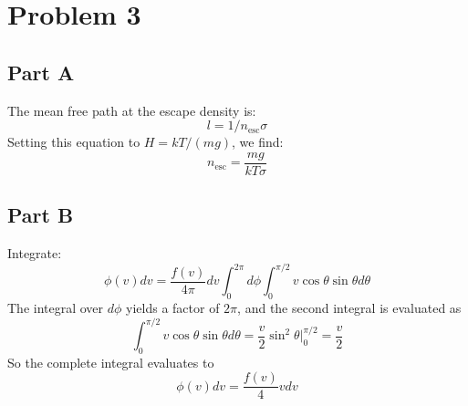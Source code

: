 \documentclass[a4paper, 11pt]{article}
\begin{document}
\section*{Problem 3}
	\subsection*{Part A}
		The mean free path at the escape density is: 
		\begin{equation*}
			l = 1/n_\text{esc}\sigma
		\end{equation*}
		Setting this equation to $H = kT/(mg)$, we find: 
		\begin{equation*}
			n_\text{esc} =\frac{mg}{kT\sigma}
		\end{equation*}
	\subsection*{Part B}
		Integrate:
		\begin{equation*}
			\phi(v)dv = \frac{f(v)}{4\pi}dv\int_0^{2\pi}d\phi\int_0^{\pi/2}v\cos\theta\sin\theta d\theta
		\end{equation*}
		The integral over $d\phi$ yields a factor of $2\pi$, and the second integral is evaluated as
		\begin{equation*}
			\int_0^{\pi/2}v\cos\theta\sin\theta d\theta = \frac{v}{2}\sin^2\theta\bigg|_0^{\pi/2} = \frac{v}{2}
		\end{equation*}
		So the complete integral evaluates to
		\begin{equation*}
			\phi(v)dv = \frac{f(v)}{4}vdv
		\end{equation*}
\end{document}
